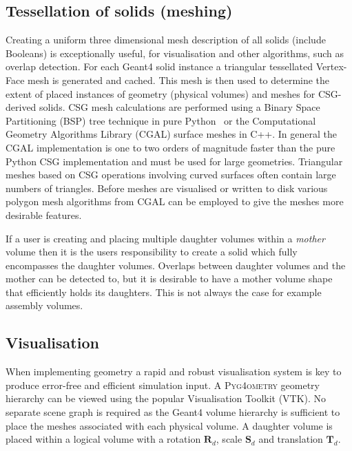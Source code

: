 \documentclass[final,5p,times,twocolumn]{elsarticle}
\newcommand{\PYGEOMETRY}{\textsc{Pyg4ometry}}
\begin{document}
\subsection{Tessellation of solids (meshing)}
Creating a uniform three dimensional mesh description of all solids (include Booleans) is exceptionally useful, for visualisation and other algorithms, such as overlap 
detection. For each Geant4 solid instance a triangular tessellated Vertex-Face mesh is generated and cached. This mesh is then used to determine the extent 
of placed instances of geometry (physical volumes) and meshes for CSG-derived solids. CSG mesh calculations are performed using a Binary Space Partitioning 
(BSP) tree technique in pure Python~\cite{pycsg} or the Computational Geometry Algorithms Library (CGAL) surface meshes \cite{cgal:bsmf-sm-20b} in C++. In 
general the CGAL implementation is one to two orders of magnitude faster than the pure Python CSG implementation and must be used for large geometries. 
Triangular meshes based on CSG operations involving curved surfaces often contain large numbers of triangles. Before meshes are visualised or written to disk 
various polygon mesh algorithms  from CGAL \cite{cgal:lty-pmp-20b} can be employed to give the meshes more desirable features. 

If a user is creating and placing multiple daughter volumes within a \emph{mother} volume then it is the users responsibility to create a solid which fully 
encompasses the daughter volumes. Overlaps between daughter volumes and the mother can be detected to, but it is desirable 
to have a mother volume shape that efficiently holds its daughters. This is not always the case for example assembly volumes. 
 
\subsection{Visualisation} \label{sec:visualisation}
When implementing geometry a rapid and robust visualisation system is key to produce error-free and efficient simulation input.
A  \PYGEOMETRY{} geometry hierarchy can be viewed using the popular Visualisation Toolkit (VTK). No separate scene graph is required as the Geant4 
volume hierarchy is sufficient to place the meshes associated with each physical volume. A daughter volume is placed within a logical volume with a rotation 
$\mathbf{R}_d$, scale $\mathbf{S}_d$ and translation $\mathbf{T}_d$.
\end{document}
